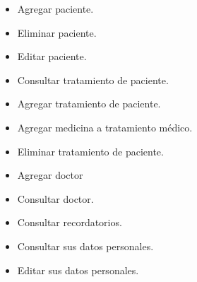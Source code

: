 \begin{itemize}
\begin{itemize}
		
		\item Agregar paciente.
		\item Eliminar paciente.
		\item Editar paciente.
		\item Consultar tratamiento de paciente.
		\item Agregar tratamiento de paciente.
		\item Agregar medicina a tratamiento médico.
		\item Eliminar tratamiento de paciente.
		\item Agregar doctor
		\item Consultar doctor.
		\item Consultar recordatorios.
		\item Consultar sus datos personales.
		\item Editar sus datos personales.
%		
	\end{itemize}
\end{itemize}


